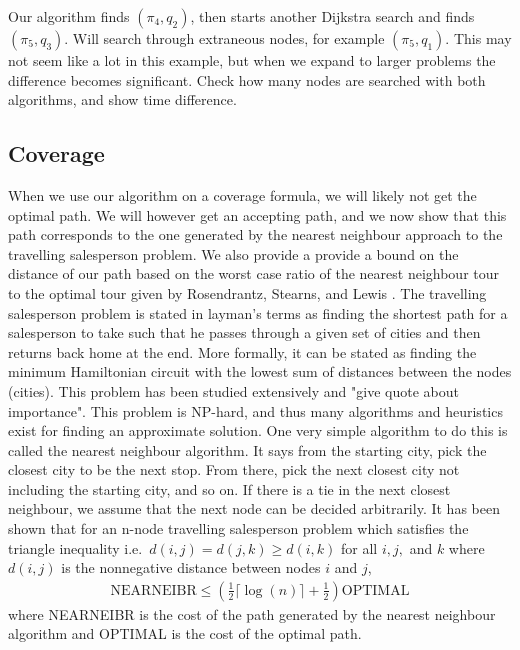 Our algorithm finds $(\pi_4,q_2)$, then starts another Dijkstra search and finds $(\pi_5,q_3)$. Will search through extraneous nodes, for example $(\pi_5,q_1)$. This may not seem like a lot in this example, but when we expand to larger problems the difference becomes significant. Check how many nodes are searched with both algorithms, and show time difference.

\subsection{Coverage}
When we use our algorithm on a coverage formula, we will likely not get the optimal path. We will however get an accepting path, and we now show that this path corresponds to the one generated by the nearest neighbour approach to the travelling salesperson problem. We also provide a provide a bound on the distance of our path based on the worst case ratio of the nearest neighbour tour to the optimal tour given by Rosendrantz, Stearns, and Lewis \cite{rosenkrantz74}. The travelling salesperson problem is stated in layman's terms as finding the shortest path for a salesperson to take such that he passes through a given set of cities and then returns back home at the end. More formally, it can be stated as finding the minimum Hamiltonian circuit with the lowest sum of distances between the nodes (cities). This problem has been studied extensively and "give quote about importance". This problem is NP-hard, and thus many algorithms and heuristics exist for finding an approximate solution. One very simple algorithm to do this is called the nearest neighbour algorithm. It says from the starting city, pick the closest city to be the next stop. From there, pick the next closest city not including the starting city, and so on. If there is a tie in the next closest neighbour, we assume that the next node can be decided arbitrarily. It has been shown that for an n-node travelling salesperson problem which satisfies the triangle inequality i.e.\ $d(i,j) = d(j,k) \geq d(i,k)$ for all $i,j,$ and $k$ where $d(i,j)$ is the nonnegative distance between nodes $i$ and $j$, 
\begin{align*}
\text{NEARNEIBR} \leq (\frac{1}{2} \lceil \log(n) \rceil + \frac{1}{2})\text{OPTIMAL}
\end{align*}
where NEARNEIBR is the cost of the path generated by the nearest neighbour algorithm and OPTIMAL is the cost of the optimal path. 


